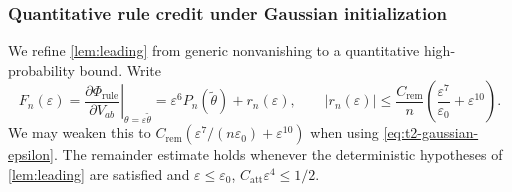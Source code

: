 
\subsubsection*{Quantitative rule credit under Gaussian initialization}
\label{app:t2-gaussian}

We refine \cref{lem:leading} from generic nonvanishing to a quantitative
high-probability bound.  Write
\begin{equation}
 F_n(\varepsilon)=
 \left.\frac{\partial\Phi_{\mathrm{rule}}}{\partial V_{ab}}
 \right|_{\theta=\varepsilon\widetilde\theta}
 =\varepsilon^6P_n(\widetilde\theta)+r_n(\varepsilon),
 \qquad
 |r_n(\varepsilon)|\le\frac{C_{\mathrm{rem}}}{n}
 \left(\frac{\varepsilon^7}{\varepsilon_0}+\varepsilon^{10}\right).
 \label{eq:quant-rule-expansion}
\end{equation}
We may weaken this to $C_{\mathrm{rem}}(\varepsilon^7/(n\varepsilon_0)+\varepsilon^{10})$
when using \cref{eq:t2-gaussian-epsilon}. The remainder estimate holds whenever the deterministic hypotheses of
\cref{lem:leading} are satisfied and
$\varepsilon\le\varepsilon_0$,
$C_{\mathrm{att}}\varepsilon^4\le1/2$.

